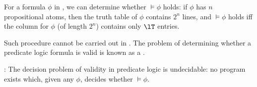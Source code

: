
  \par For a formula $\phi$ in , we can determine whether $\models \phi$ holds: if $\phi$ has $n$ propositional atoms, then the truth table of $\phi$ contains $2^n$ lines, and $\models \phi$ holds iff the column for $\phi$ (of length $2^n$) contains only $\lT$ entries.
  \par Such procedure cannot be carried out in . The problem of determining whether a predicate logic formula is valid is known as a .
  \begin{center}
  \end{center}

  : The decision problem of validity in predicate logic is undecidable: no program exists which, given any $\phi$, decides whether $\models \phi$.